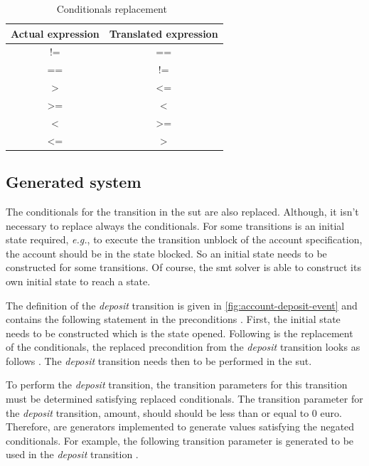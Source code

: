 \begin{table}[h!]
\centering
\begin{tabular}{cc}
\toprule
\textbf{Actual expression} & \textbf{Translated expression} \\ \midrule
!=                         & ==                             \\
==                         & !=                             \\
\textgreater               & \textless=                     \\
\textgreater=              & \textless                      \\
\textless                  & \textgreater=                  \\
\textless=                 & \textgreater                   \\ \bottomrule
\end{tabular}
\caption{Conditionals replacement~\cite{pitmutators}}\label{fig:table-replacement-conditions}
\end{table}
\FloatBarrier

\subsection{Generated system}
The conditionals for the transition in the \gls{sut} are also replaced.
Although, it isn't necessary to replace always the conditionals. For some
transitions is an initial state required, \textit{e.g.}, to execute the transition unblock
of the account specification, the account should be in the state blocked. So an
initial state needs to be constructed for some transitions. Of course, the \gls{smt}
solver is able to construct its own initial state to reach a state.

The definition of the \textit{deposit} transition is given in
\autoref{fig:account-deposit-event} and contains the following statement in the
preconditions . First, the initial state needs to be
constructed which is the state opened. Following is the replacement of the conditionals, the
replaced precondition from the \textit{deposit} transition looks as follows
. The \textit{deposit} transition needs then to be
performed in the \gls{sut}.

To perform the \textit{deposit} transition, the transition parameters for this
transition must be determined satisfying replaced conditionals. The transition
parameter for the \textit{deposit} transition, amount, should should be less
than or equal to 0 euro. Therefore, are generators implemented to generate
values satisfying the negated conditionals. For example, the following
transition parameter is generated to be used in the \textit{deposit} transition
.

